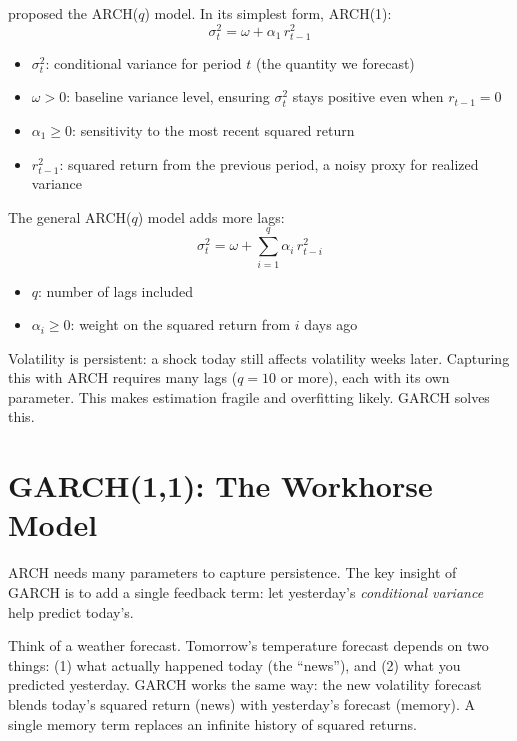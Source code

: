 \citet{Engle1982} proposed the ARCH($q$) model. In its simplest form, ARCH(1):
%
\begin{equation}
\label{eq:arch1}
\sigma^2_t = \omega + \alpha_1 \, r^2_{t-1}
\end{equation}
%
\begin{itemize}[nosep]
  \item $\sigma^2_t$: conditional variance for period $t$ (the quantity we forecast)
  \item $\omega > 0$: baseline variance level, ensuring $\sigma^2_t$ stays positive
        even when $r_{t-1} = 0$
  \item $\alpha_1 \geq 0$: sensitivity to the most recent squared return
  \item $r^2_{t-1}$: squared return from the previous period, a noisy proxy for
        realized variance
\end{itemize}

The general ARCH($q$) model adds more lags:
%
\begin{equation}
\label{eq:archq}
\sigma^2_t = \omega + \sum_{i=1}^{q} \alpha_i \, r^2_{t-i}
\end{equation}
%
\begin{itemize}[nosep]
  \item $q$: number of lags included
  \item $\alpha_i \geq 0$: weight on the squared return from $i$ days ago
\end{itemize}

\begin{warning}
Volatility is persistent: a shock today still affects volatility weeks later.
Capturing this with ARCH requires many lags ($q = 10$ or more), each with its own
parameter. This makes estimation fragile and overfitting likely. GARCH solves this.
\end{warning}


\section{GARCH(1,1): The Workhorse Model}
\label{sec:garch11}

ARCH needs many parameters to capture persistence. The key insight of GARCH is
to add a single feedback term: let yesterday's \emph{conditional variance} help
predict today's.

\begin{intuition}
Think of a weather forecast. Tomorrow's temperature forecast depends on two things:
(1) what actually happened today (the ``news''), and (2) what you predicted
yesterday. GARCH works the same way: the new volatility forecast blends today's
squared return (news) with yesterday's forecast (memory). A single memory term
replaces an infinite history of squared returns.
\end{intuition}

